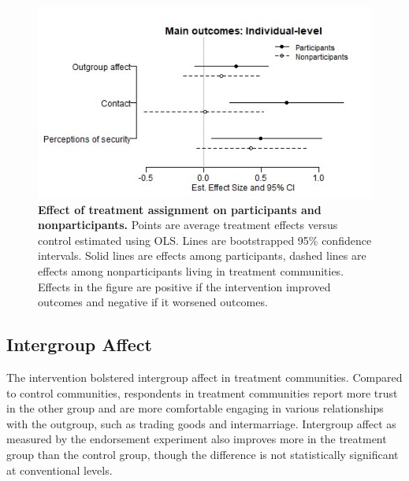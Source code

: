 \documentclass[11pt]{article}
\begin{document}
\begin{figure}[H]
\centering
\includegraphics[width=.7\textwidth]{../../../figs/ecpn_coefplots_MainOuts_panel-cats2.jpg}
\caption{\label{fig:fig2} \textbf{Effect of treatment assignment on participants and nonparticipants.} Points are average treatment effects versus control estimated using OLS. Lines are bootstrapped 95\% confidence intervals.  Solid lines are effects among participants, dashed lines are effects among nonparticipants living in treatment communities.  Effects in the figure are positive if the intervention improved outcomes and negative if it worsened outcomes.}
\end{figure}

\hypertarget{intergroup-affect}{%
\subsection{Intergroup Affect}\label{intergroup-affect}}

The intervention bolstered intergroup affect in treatment communities.
Compared to control communities, respondents in treatment communities
report more trust in the other group and are more comfortable engaging
in various relationships with the outgroup, such as trading goods and
intermarriage. Intergroup affect as measured by the endorsement
experiment also improves more in the treatment group than the control
group, though the difference is not statistically significant at
conventional levels.
\end{document}
